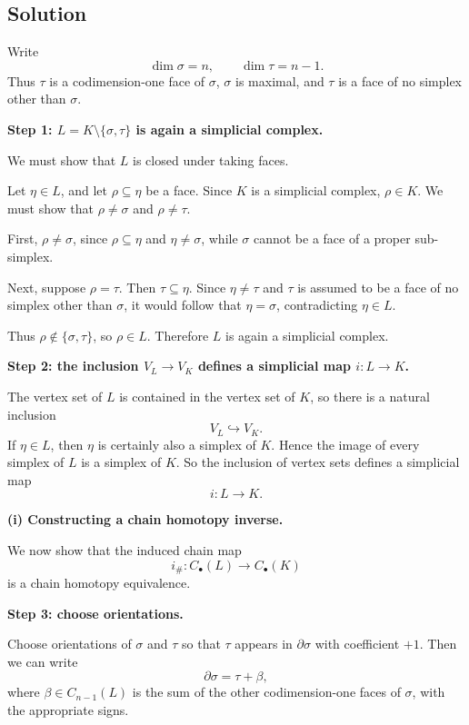 \documentclass[12pt,a4paper]{article}
\theoremstyle{notespace}
\begin{document}
\subsection{Solution}

Write
\[
\dim \sigma = n,
\qquad
\dim \tau = n-1.
\]
Thus \(\tau\) is a codimension-one face of \(\sigma\), \(\sigma\) is maximal, and \(\tau\) is a face of no simplex other than \(\sigma\).

\medskip

\textbf{Step 1: \(L=K\setminus\{\sigma,\tau\}\) is again a simplicial complex.}

We must show that \(L\) is closed under taking faces.

Let \(\eta\in L\), and let \(\rho\subseteq \eta\) be a face. Since \(K\) is a simplicial complex, \(\rho\in K\). We must show that \(\rho\neq \sigma\) and \(\rho\neq \tau\).

First, \(\rho\neq \sigma\), since \(\rho\subseteq \eta\) and \(\eta\neq \sigma\), while \(\sigma\) cannot be a face of a proper sub-simplex.

Next, suppose \(\rho=\tau\). Then \(\tau\subseteq \eta\). Since \(\eta\neq \tau\) and \(\tau\) is assumed to be a face of no simplex other than \(\sigma\), it would follow that \(\eta=\sigma\), contradicting \(\eta\in L\).

Thus \(\rho\notin \{\sigma,\tau\}\), so \(\rho\in L\). Therefore \(L\) is again a simplicial complex.

\medskip

\textbf{Step 2: the inclusion \(V_L\to V_K\) defines a simplicial map \(i:L\to K\).}

The vertex set of \(L\) is contained in the vertex set of \(K\), so there is a natural inclusion
\[
V_L\hookrightarrow V_K.
\]
If \(\eta\in L\), then \(\eta\) is certainly also a simplex of \(K\). Hence the image of every simplex of \(L\) is a simplex of \(K\). So the inclusion of vertex sets defines a simplicial map
\[
i:L\to K.
\]

\bigskip

\textbf{(i) Constructing a chain homotopy inverse.}

We now show that the induced chain map
\[
i_\#:C_\bullet(L)\to C_\bullet(K)
\]
is a chain homotopy equivalence.

\medskip

\textbf{Step 3: choose orientations.}

Choose orientations of \(\sigma\) and \(\tau\) so that \(\tau\) appears in \(\partial \sigma\) with coefficient \(+1\). Then we can write
\[
\partial \sigma = \tau + \beta,
\]
where \(\beta\in C_{n-1}(L)\) is the sum of the other codimension-one faces of \(\sigma\), with the appropriate signs.
\end{document}
